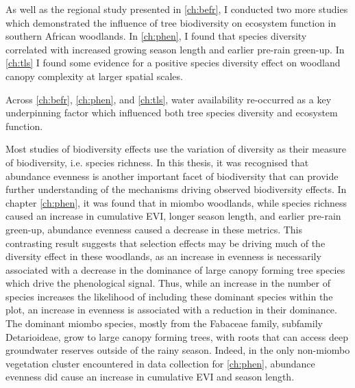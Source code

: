 \begin{refsection}
As well as the regional study presented in \autoref{ch:befr}, I conducted two more studies which demonstrated the influence of tree biodiversity on ecosystem function in southern African woodlands. In \autoref{ch:phen}, I found that species diversity correlated with increased growing season length and earlier pre-rain green-up. In \autoref{ch:tls} I found some evidence for a positive species diversity effect on woodland canopy complexity at larger spatial scales.



Across \autoref{ch:befr}, \autoref{ch:phen}, and \autoref{ch:tls}, water availability re-occurred as a key underpinning factor which influenced both tree species diversity and ecosystem function. 


Most studies of biodiversity effects use the variation of diversity as their measure of biodiversity, i.e. species richness. In this thesis, it was recognised that abundance evenness is another important facet of biodiversity that can provide further understanding of the mechanisms driving observed biodiversity effects. In chapter \autoref{ch:phen}, it was found that in miombo woodlands, while species richness caused an increase in cumulative EVI, longer season length, and earlier pre-rain green-up, abundance evenness caused a decrease in these metrics. This contrasting result suggests that selection effects may be driving much of the diversity effect in these woodlands, as an increase in evenness is necessarily associated with a decrease in the dominance of large canopy forming tree species which drive the phenological signal. Thus, while an increase in the number of species increases the likelihood of including these dominant species within the plot, an increase in evenness is associated with a reduction in their dominance. The dominant miombo species, mostly from the Fabaceae family, subfamily Detarioideae, grow to large canopy forming trees, with roots that can access deep groundwater reserves outside of the rainy season. Indeed, in the only non-miombo vegetation cluster encountered in data collection for \autoref{ch:phen}, abundance evenness did cause an increase in cumulative EVI and season length.


\end{refsection}
